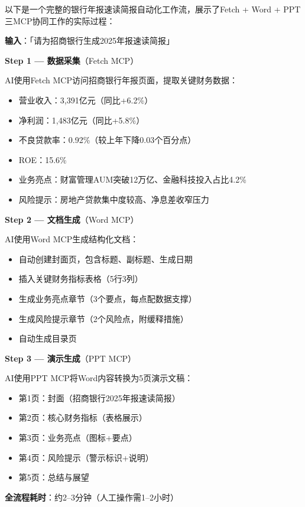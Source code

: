 \begin{casebox}[银行年报速读简报自动生成全流程]
以下是一个完整的银行年报速读简报自动化工作流，展示了Fetch + Word + PPT三MCP协同工作的实际过程：

\textbf{输入}：「请为招商银行生成2025年报速读简报」

\textbf{Step 1 — 数据采集}（Fetch MCP）

AI使用Fetch MCP访问招商银行年报页面，提取关键财务数据：
\begin{itemize}
  \item 营业收入：3,391亿元（同比+6.2\%）
  \item 净利润：1,483亿元（同比+5.8\%）
  \item 不良贷款率：0.92\%（较上年下降0.03个百分点）
  \item ROE：15.6\%
  \item 业务亮点：财富管理AUM突破12万亿、金融科技投入占比4.2\%
  \item 风险提示：房地产贷款集中度较高、净息差收窄压力
\end{itemize}

\textbf{Step 2 — 文档生成}（Word MCP）

AI使用Word MCP生成结构化文档：
\begin{itemize}
  \item 自动创建封面页，包含标题、副标题、生成日期
  \item 插入关键财务指标表格（5行3列）
  \item 生成业务亮点章节（3个要点，每点配数据支撑）
  \item 生成风险提示章节（2个风险点，附缓释措施）
  \item 自动生成目录页
\end{itemize}

\textbf{Step 3 — 演示生成}（PPT MCP）

AI使用PPT MCP将Word内容转换为5页演示文稿：
\begin{itemize}
  \item 第1页：封面（招商银行2025年报速读简报）
  \item 第2页：核心财务指标（表格展示）
  \item 第3页：业务亮点（图标+要点）
  \item 第4页：风险提示（警示标识+说明）
  \item 第5页：总结与展望
\end{itemize}

\textbf{全流程耗时}：约2--3分钟（人工操作需1--2小时）
\end{casebox}

